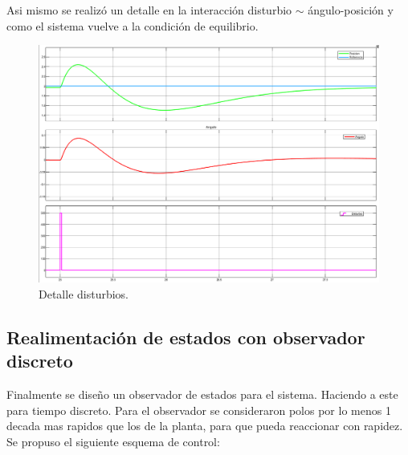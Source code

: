 Asi mismo se realizó un detalle en la interacción disturbio $\sim$ ángulo-posici\'on y como el sistema vuelve a la condici\'on de equilibrio.
\begin{figure}[H]
	\centering
	\includegraphics[width=1\linewidth]{Imagenes/Control_por_realimentacion/detalle_disturbio.png}
	\caption{Detalle disturbios.}
	\label{realmentacion_disturbio}
\end{figure}


 \subsection{Realimentaci\'on de estados con observador discreto}
Finalmente se diseño un observador de estados  para el sistema. Haciendo a este para tiempo discreto.
Para el observador se consideraron polos por lo menos 1 decada mas rapidos que los de la planta, para que pueda reaccionar con rapidez.
Se propuso el siguiente esquema de control:


